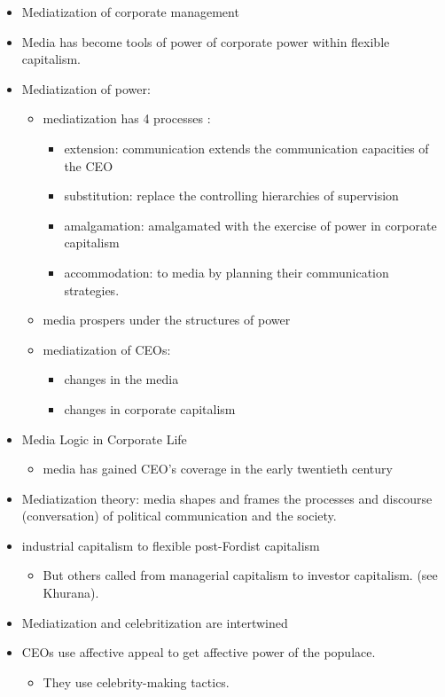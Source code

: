 \documentclass[
]{book}
\providecommand{\tightlist}{%
  \setlength{\itemsep}{0pt}\setlength{\parskip}{0pt}}
\begin{document}
\begin{itemize}
\item
  Mediatization of corporate management
\item
  Media has become tools of power of corporate power within flexible capitalism.
\item
  Mediatization of power:

  \begin{itemize}
  \item
    mediatization has 4 processes \citep{Schulz_2004}:

    \begin{itemize}
    \item
      extension: communication extends the communication capacities of the CEO
    \item
      substitution: replace the controlling hierarchies of supervision
    \item
      amalgamation: amalgamated with the exercise of power in corporate capitalism
    \item
      accommodation: to media by planning their communication strategies.
    \end{itemize}
  \item
    media prospers under the structures of power
  \item
    mediatization of CEOs:

    \begin{itemize}
    \item
      changes in the media
    \item
      changes in corporate capitalism
    \end{itemize}
  \end{itemize}
\item
  Media Logic in Corporate Life

  \begin{itemize}
  \tightlist
  \item
    media has gained CEO's coverage in the early twentieth century \citep[pp.~31]{Kantola_2014}
  \end{itemize}
\item
  Mediatization theory: media shapes and frames the processes and discourse (conversation) of political communication and the society.
\item
  industrial capitalism to flexible post-Fordist capitalism

  \begin{itemize}
  \tightlist
  \item
    But others called from managerial capitalism to investor capitalism. (see Khurana).
  \end{itemize}
\item
  Mediatization and celebritization are intertwined
\item
  CEOs use affective appeal to get affective power of the populace.

  \begin{itemize}
  \tightlist
  \item
    They use celebrity-making tactics.
  \end{itemize}
\end{itemize}
\end{document}
